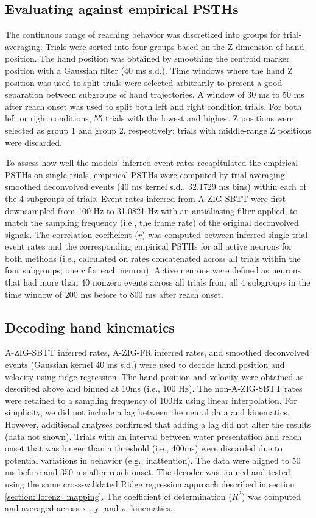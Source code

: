 \documentclass{article}
\begin{document}
\subsection{Evaluating against empirical PSTHs}

The continuous range of reaching behavior was discretized into groups for trial-averaging. Trials were sorted into four groups based on the Z dimension of hand position. The hand position was obtained by smoothing the centroid marker position with a Gaussian filter (40 ms s.d.). Time windows where the hand Z position was used to split trials were selected arbitrarily to present a good separation between subgroups of hand trajectories. A window of 30 ms to 50 ms after reach onset was used to split both left and right condition trials. For both left or right conditions, 55 trials with the lowest and highest Z positions were selected as group 1 and group 2, respectively; trials with middle-range Z positions were discarded.

To assess how well the models' inferred event rates recapitulated the empirical PSTHs on single trials, empirical PSTHs were computed by trial-averaging smoothed deconvolved events (40 ms kernel s.d., 32.1729 ms bins) within each of the 4 subgroups of trials. Event rates inferred from A-ZIG-SBTT were first downsampled from 100 Hz to 31.0821 Hz with an antialiasing filter applied, to match the sampling frequency (i.e., the frame rate) of the original deconvolved signals. The correlation coefficient ($r$) was computed between inferred single-trial event rates and the corresponding empirical PSTHs for all active neurons for both methods (i.e., calculated on rates concatenated across all trials within the four subgroups; one $r$ for each neuron). Active neurons were defined as neurons that had more than 40 nonzero events across all trials from all 4 subgroups in the time window of 200 ms before to 800 ms after reach onset.

\subsection{Decoding hand kinematics}

A-ZIG-SBTT inferred rates, A-ZIG-FR inferred rates, and smoothed deconvolved events (Gaussian kernel 40 ms s.d.) were used to decode hand position and velocity using ridge regression. The hand position and velocity were obtained as described above and binned at 10ms (i.e., 100 Hz). The non-A-ZIG-SBTT rates were retained to a sampling frequency of 100Hz using linear interpolation. For simplicity, we did not include a lag between the neural data and kinematics. However, additional analyses confirmed that adding a lag did not alter the results (data not shown). Trials with an interval between water presentation and reach onset that was longer than a threshold (i.e., 400ms) were discarded due to potential variations in behavior (e.g., inattention). The data were aligned to 50 ms before and 350 ms after reach onset. The decoder was trained and tested using the same cross-validated Ridge regression approach described in section \ref{section: lorenz_mapping}. The coefficient of determination ($R^{2}$) was computed and averaged across x-, y- and z- kinematics.
\end{document}

